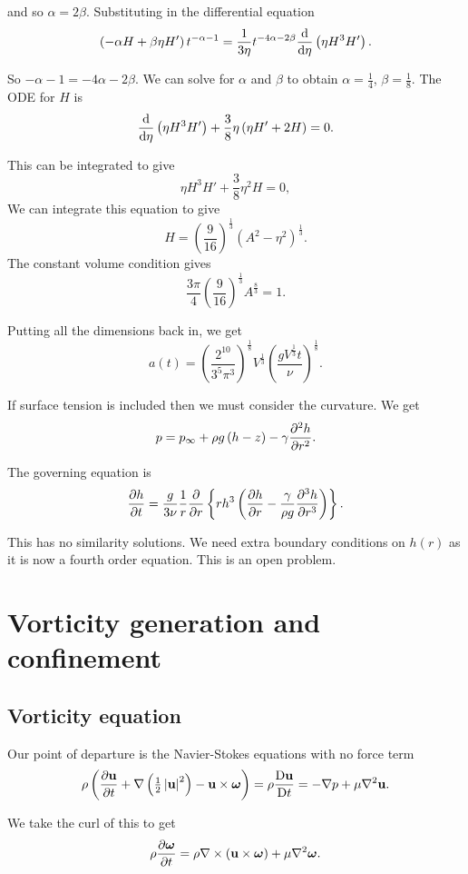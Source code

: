 \documentclass{notes}
\newcommand{\om}{\boldsymbol{\omega}}
\theoremstyle{plain}
\begin{document}
and so $\alpha = 2 \beta$.  Substituting in the differential equation
\[
\left( - \alpha H + \beta \eta H' \right) t^{-\alpha - 1}
= \frac{1}{3 \eta} t^{-4 \alpha - 2 \beta} \frac{\mathrm{d}}{\mathrm{d}\eta} \left(
\eta H^3 H'\right).
\]

So $- \alpha - 1 = - 4 \alpha - 2 \beta$. We can solve for $\alpha$
and $\beta$ to obtain $\alpha = \frac{1}{4}$, $\beta = \frac{1}{8}$.  The
ODE for $H$ is
\[
\frac{\mathrm{d}}{\mathrm{d}\eta} \left( \eta H^3 H' \right) + \frac{3}{8} \eta
\left( \eta H' + 2 H \right) = 0.
\]

This can be integrated to give
\[
\eta H^3 H' + \frac{3}{8} \eta^2 H = 0,
\]
We can integrate this equation to give
\[
H = \left( \frac{9}{16} \right)^{\frac{1}{3}} \left(A^2 - \eta^2 \right)^
{\frac{1}{3}}.
\]
The constant volume condition gives
\[
\frac{3 \pi}{4} \left( \frac{9}{16} \right)^{\frac{1}{3}} A^{\frac{8}{3}} = 1.
\]

Putting all the dimensions back in, we get
\[
a(t) = \left( \frac{2^{10}}{3^5 \pi^3} \right)^{\frac{1}{8}}
V^{\frac{1}{3}} \left( \frac{g V^{\frac{1}{3}} t}{\nu} \right)^{\frac{1}{8}}.
\]

If surface tension is included then we must consider the
curvature.  We get
\[
p = p_\infty + \rho g\left(h - z\right) - \gamma \frac{\partial ^2 h}{\partial r^2}.
\]

The governing equation is
\[
\frac{\partial h}{\partial t} = \frac{g}{3 \nu} \frac{1}{r} \frac{\partial }{\partial r} \left\{
r h^3 \left( \frac{\partial h}{\partial r} - \frac{\gamma}{\rho g} \frac{\partial ^3 h}{\partial r^3}\right)
\right\}.
\]

This has no similarity solutions.  We need extra boundary conditions on $h(r)$
as it is now a fourth order equation.  This is an open problem.

\chapter{Vorticity generation and confinement}

\section{Vorticity equation}

Our point of departure is the Navier-Stokes equations with no force term
\[
\rho \left( \pd{\vu}{t} + \nabla \left( \tfrac{1}{2} \abs{\vu}^2 \right)
- \vu \times \om \right) = \rho \DDt{\vu} = - \nabla p + \mu \nabla^2 \vu.
\]

We take the curl of this to get
\[
\rho \pd{\om}{t} = \rho \nabla \times \left( \vu \times \om \right)
+ \mu \nabla^2 \om.
\]
\end{document}
